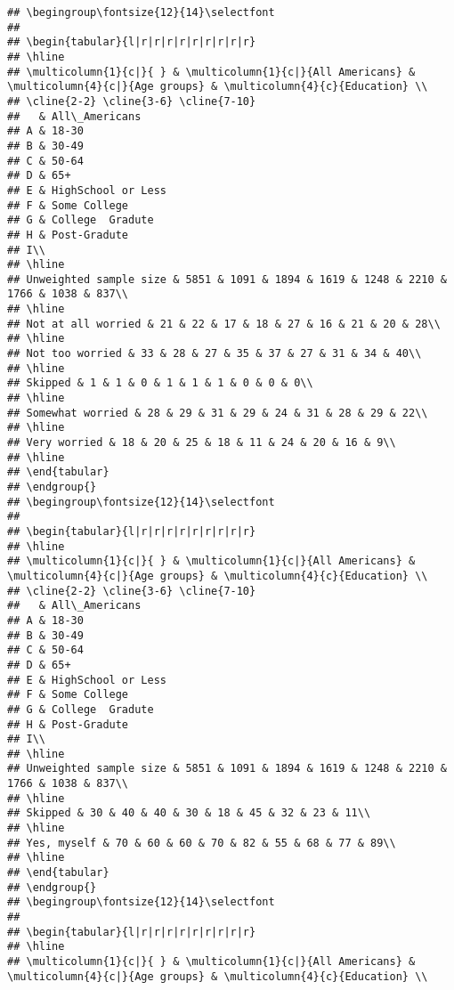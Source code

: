 \documentclass[
]{article}
\begin{document}
\begin{verbatim}
## \begingroup\fontsize{12}{14}\selectfont
## 
## \begin{tabular}{l|r|r|r|r|r|r|r|r|r}
## \hline
## \multicolumn{1}{c|}{ } & \multicolumn{1}{c|}{All Americans} & \multicolumn{4}{c|}{Age groups} & \multicolumn{4}{c}{Education} \\
## \cline{2-2} \cline{3-6} \cline{7-10}
##   & All\_Americans
## A & 18-30
## B & 30-49
## C & 50-64
## D & 65+
## E & HighSchool or Less
## F & Some College
## G & College  Gradute
## H & Post-Gradute
## I\\
## \hline
## Unweighted sample size & 5851 & 1091 & 1894 & 1619 & 1248 & 2210 & 1766 & 1038 & 837\\
## \hline
## Not at all worried & 21 & 22 & 17 & 18 & 27 & 16 & 21 & 20 & 28\\
## \hline
## Not too worried & 33 & 28 & 27 & 35 & 37 & 27 & 31 & 34 & 40\\
## \hline
## Skipped & 1 & 1 & 0 & 1 & 1 & 1 & 0 & 0 & 0\\
## \hline
## Somewhat worried & 28 & 29 & 31 & 29 & 24 & 31 & 28 & 29 & 22\\
## \hline
## Very worried & 18 & 20 & 25 & 18 & 11 & 24 & 20 & 16 & 9\\
## \hline
## \end{tabular}
## \endgroup{}
## \begingroup\fontsize{12}{14}\selectfont
## 
## \begin{tabular}{l|r|r|r|r|r|r|r|r|r}
## \hline
## \multicolumn{1}{c|}{ } & \multicolumn{1}{c|}{All Americans} & \multicolumn{4}{c|}{Age groups} & \multicolumn{4}{c}{Education} \\
## \cline{2-2} \cline{3-6} \cline{7-10}
##   & All\_Americans
## A & 18-30
## B & 30-49
## C & 50-64
## D & 65+
## E & HighSchool or Less
## F & Some College
## G & College  Gradute
## H & Post-Gradute
## I\\
## \hline
## Unweighted sample size & 5851 & 1091 & 1894 & 1619 & 1248 & 2210 & 1766 & 1038 & 837\\
## \hline
## Skipped & 30 & 40 & 40 & 30 & 18 & 45 & 32 & 23 & 11\\
## \hline
## Yes, myself & 70 & 60 & 60 & 70 & 82 & 55 & 68 & 77 & 89\\
## \hline
## \end{tabular}
## \endgroup{}
## \begingroup\fontsize{12}{14}\selectfont
## 
## \begin{tabular}{l|r|r|r|r|r|r|r|r|r}
## \hline
## \multicolumn{1}{c|}{ } & \multicolumn{1}{c|}{All Americans} & \multicolumn{4}{c|}{Age groups} & \multicolumn{4}{c}{Education} \\

\end{verbatim}
\end{document}
